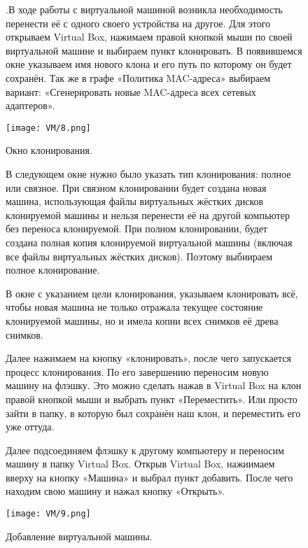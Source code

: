 \begin{figure}
.\quad В ходе работы с виртуальной машиной возникла необходимость перенести её с одного своего устройства на другое.
\newline Для этого открываем Virtual Box, нажимаем правой кнопкой мыши по своей виртуальной машине и выбираем пункт клонировать. В появившемся окне указываем имя нового клона и его путь по которому он будет сохранён. Так же в графе «Политика MAC-адреса» выбираем вариант: «Сгенерировать новые MAC-адреса всех сетевых адаптеров».
		
		\centering
		\texttt{[image: VM/8.png]}
\caption{Окно клонирования.}
\label{ris:image}
\end{figure}

\begin{figure}
\quad В следующем окне нужно было указать тип клонирования: полное или связное. При связном клонировании будет создана новая машина, использующая файлы виртуальных жёстких дисков клонируемой машины и нельзя перенести её на другой компьютер без переноса клонируемой. При полном клонировании, будет создана полная копия клонируемой виртуальной машины (включая все файлы виртуальных жёстких дисков). Поэтому выбиираем полное клонирование.
\end{figure}

\begin{figure}
\quad В окне с указанием цели клонирования, указываем клонировать всё, чтобы новая машина не только отражала текущее состояние клонируемой машины, но и имела копии всех снимков её древа снимков.
\end{figure}

\begin{figure}
\quad Далее нажимаем на кнопку «клонировать», после чего запускается процесс клонирования. По его завершению переносим новую машину на флэшку. Это можно сделать нажав в Virtual Box на клон правой кнопкой мыши и выбрать пункт «Переместить». Или просто зайти в папку, в которую был сохранён наш клон, и переместить его уже оттуда.
\end{figure}

\begin{figure}
\quad Далее подсоединяем флэшку к другому компьютеру и переносим машину в папку Virtual Box. Открыв Virtual Box, нажиимаем вверху на кнопку «Машина» и выбрал пункт добавить. После чего находим свою машину и нажал кнопку «Открыть».

		\centering
		\texttt{[image: VM/9.png]}
\caption{Добавление виртуальной машины.}
\label{ris:image}
\end{figure}

